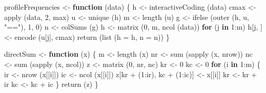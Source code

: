 \documentclass[
  12pt,
]{book}
\newenvironment{Shaded}{\begin{snugshade}}{\end{snugshade}}
\newcommand{\AttributeTok}[1]{\textcolor[rgb]{0.77,0.63,0.00}{#1}}
\newcommand{\ControlFlowTok}[1]{\textcolor[rgb]{0.13,0.29,0.53}{\textbf{#1}}}
\newcommand{\DecValTok}[1]{\textcolor[rgb]{0.00,0.00,0.81}{#1}}
\newcommand{\FunctionTok}[1]{\textcolor[rgb]{0.00,0.00,0.00}{#1}}
\newcommand{\NormalTok}[1]{#1}
\newcommand{\OtherTok}[1]{\textcolor[rgb]{0.56,0.35,0.01}{#1}}
\newcommand{\SpecialCharTok}[1]{\textcolor[rgb]{0.00,0.00,0.00}{#1}}
\newcommand{\StringTok}[1]{\textcolor[rgb]{0.31,0.60,0.02}{#1}}
\begin{document}
\begin{Shaded}
\begin{Highlighting}[]
\NormalTok{profileFrequencies }\OtherTok{\textless{}{-}} \ControlFlowTok{function}\NormalTok{ (data) \{}
\NormalTok{  h }\OtherTok{\textless{}{-}} \FunctionTok{interactiveCoding}\NormalTok{ (data)}
\NormalTok{  cmax }\OtherTok{\textless{}{-}} \FunctionTok{apply}\NormalTok{ (data, }\DecValTok{2}\NormalTok{, max)}
\NormalTok{  u }\OtherTok{\textless{}{-}} \FunctionTok{unique}\NormalTok{ (h)}
\NormalTok{  m }\OtherTok{\textless{}{-}} \FunctionTok{length}\NormalTok{ (u)}
\NormalTok{  g }\OtherTok{\textless{}{-}} \FunctionTok{ifelse}\NormalTok{ (}\FunctionTok{outer}\NormalTok{ (h, u, }\StringTok{"=="}\NormalTok{), }\DecValTok{1}\NormalTok{, }\DecValTok{0}\NormalTok{)}
\NormalTok{  n }\OtherTok{\textless{}{-}} \FunctionTok{colSums}\NormalTok{ (g)}
\NormalTok{  h }\OtherTok{\textless{}{-}} \FunctionTok{matrix}\NormalTok{ (}\DecValTok{0}\NormalTok{, m, }\FunctionTok{ncol}\NormalTok{ (data))}
  \ControlFlowTok{for}\NormalTok{ (j }\ControlFlowTok{in} \DecValTok{1}\SpecialCharTok{:}\NormalTok{m)}
\NormalTok{    h[j, ] }\OtherTok{\textless{}{-}} \FunctionTok{encode}\NormalTok{ (u[j], cmax)}
  \FunctionTok{return}\NormalTok{ (}\FunctionTok{list}\NormalTok{ (}\AttributeTok{h =}\NormalTok{ h, }\AttributeTok{n =}\NormalTok{ n))}
\NormalTok{\}}


\NormalTok{directSum }\OtherTok{\textless{}{-}} \ControlFlowTok{function}\NormalTok{ (x) \{}
\NormalTok{  m }\OtherTok{\textless{}{-}} \FunctionTok{length}\NormalTok{ (x)}
\NormalTok{  nr }\OtherTok{\textless{}{-}} \FunctionTok{sum}\NormalTok{ (}\FunctionTok{sapply}\NormalTok{ (x, nrow))}
\NormalTok{  nc }\OtherTok{\textless{}{-}} \FunctionTok{sum}\NormalTok{ (}\FunctionTok{sapply}\NormalTok{ (x, ncol))}
\NormalTok{  z }\OtherTok{\textless{}{-}} \FunctionTok{matrix}\NormalTok{ (}\DecValTok{0}\NormalTok{, nr, nc)}
\NormalTok{  kr }\OtherTok{\textless{}{-}} \DecValTok{0}
\NormalTok{  kc }\OtherTok{\textless{}{-}} \DecValTok{0}
  \ControlFlowTok{for}\NormalTok{ (i }\ControlFlowTok{in} \DecValTok{1}\SpecialCharTok{:}\NormalTok{m) \{}
\NormalTok{    ir }\OtherTok{\textless{}{-}} \FunctionTok{nrow}\NormalTok{ (x[[i]])}
\NormalTok{    ic }\OtherTok{\textless{}{-}} \FunctionTok{ncol}\NormalTok{ (x[[i]])}
\NormalTok{    z[kr }\SpecialCharTok{+}\NormalTok{ (}\DecValTok{1}\SpecialCharTok{:}\NormalTok{ir), kc }\SpecialCharTok{+}\NormalTok{ (}\DecValTok{1}\SpecialCharTok{:}\NormalTok{ic)] }\OtherTok{\textless{}{-}}\NormalTok{ x[[i]]}
\NormalTok{    kr }\OtherTok{\textless{}{-}}\NormalTok{ kr }\SpecialCharTok{+}\NormalTok{ ir}
\NormalTok{    kc }\OtherTok{\textless{}{-}}\NormalTok{ kc }\SpecialCharTok{+}\NormalTok{ ic}
\NormalTok{  \}}
  \FunctionTok{return}\NormalTok{ (z)}
\NormalTok{\}}
\end{Highlighting}
\end{Shaded}
\end{document}
